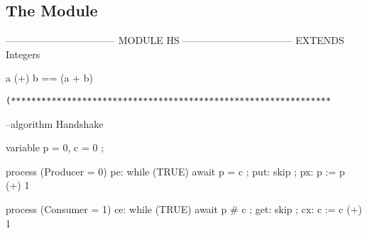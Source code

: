 \documentclass[fleqn,leqno]{article}
\begin{document}
\setlength{\parindent}{0pt}
\subsection*{The Module}


\smallskip


\begin{notla}
--------------------------------- MODULE HS ---------------------------------
EXTENDS Integers

a (+) b == (a + b) %
\end{notla}
\begin{tlatex}
\@x{}\moduleLeftDash{}\moduleRightDash\@xx{}%
%
\@pvspace{8.0pt}%
%
\end{tlatex}

\vspace{1em}

\verb|(***************************************************************|


\begin{nopcal}
--algorithm Handshake {

    variable p = 0,  c = 0 ;

    process (Producer = 0) 
      { pe: while (TRUE)
              {      await p = c ;
                put: skip ;
                px:  p := p (+) 1   }
      }
      
   process (Consumer = 1)
     { ce: while (TRUE)
             {      await p # c ;
               get: skip ;
               cx:  c := c (+) 1   }
     }
}
\end{nopcal}
\begin{tlatex}
%
\@pvspace{8.0pt}%
%
\@pvspace{8.0pt}%
%
%
%
%
\@pvspace{8.0pt}%
%
%
%
%
\@x{ {\p@rbrace}}%
\end{tlatex}
\end{document}
